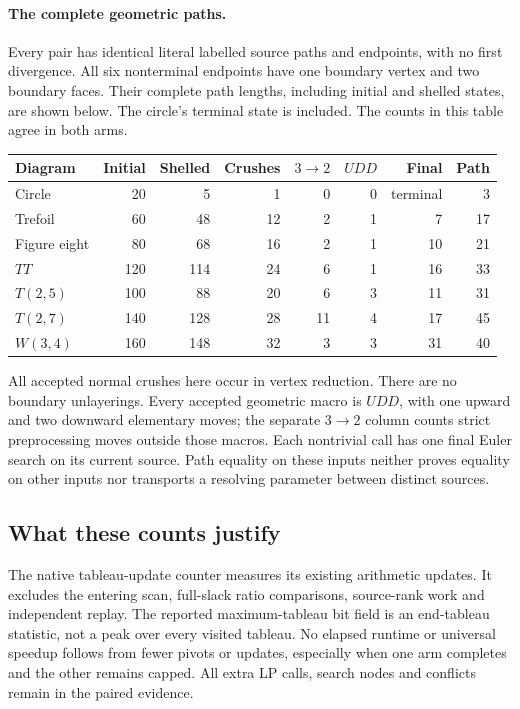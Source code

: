\paragraph{The complete geometric paths.}
Every pair has identical literal labelled source paths and endpoints, with
no first divergence.  All six nonterminal endpoints have one boundary
vertex and two boundary faces.  Their complete path lengths, including
initial and shelled states, are shown below.  The circle's terminal state
is included.  The counts in this table agree in both arms.
\begin{center}
\begin{tabular}{lrrrrrrr}
\toprule
Diagram & Initial & Shelled & Crushes & $3\to2$ & $UDD$ & Final & Path\\
\midrule
Circle & 20 & 5 & 1 & 0 & 0 & terminal & 3\\
Trefoil & 60 & 48 & 12 & 2 & 1 & 7 & 17\\
Figure eight & 80 & 68 & 16 & 2 & 1 & 10 & 21\\
$TT$ & 120 & 114 & 24 & 6 & 1 & 16 & 33\\
$T(2,5)$ & 100 & 88 & 20 & 6 & 3 & 11 & 31\\
$T(2,7)$ & 140 & 128 & 28 & 11 & 4 & 17 & 45\\
$W(3,4)$ & 160 & 148 & 32 & 3 & 3 & 31 & 40\\
\bottomrule
\end{tabular}
\end{center}
All accepted normal crushes here occur in vertex reduction.  There are no
boundary unlayerings.  Every accepted geometric macro is $UDD$, with one
upward and two downward elementary moves; the separate $3\to2$ column
counts strict preprocessing moves outside those macros.  Each nontrivial
call has one final Euler search on its current source.  Path equality on these
inputs neither proves equality on other inputs nor transports a resolving
parameter between distinct sources.

\subsection{What these counts justify}

The native tableau-update counter measures its existing arithmetic updates.
It excludes the entering scan, full-slack ratio comparisons, source-rank
work and independent replay.  The reported maximum-tableau bit field is an
end-tableau statistic, not a peak over every visited tableau.  No elapsed
runtime or universal speedup follows from fewer pivots or updates, especially
when one arm completes and the other remains capped.  All extra LP calls,
search nodes and conflicts remain in the paired evidence.


